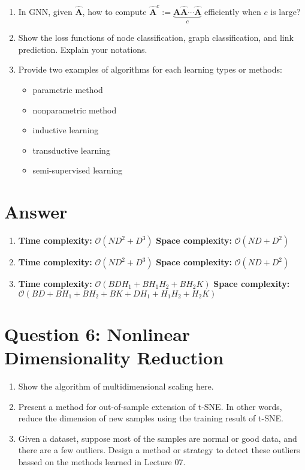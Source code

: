 \documentclass[
	12pt, %
]{fphw}
\begin{document}
\begin{problem}
\begin{enumerate}
	\item In GNN, given $\hat{\mathbf{A}}$, how to compute $\hat{\mathbf{A}}^c:=\underbrace{\hat{\mathbf{A}}\hat{\mathbf{A}}\cdots \hat{\mathbf{A}}}_c$ efficiently when $c$ is large? 
    
    \item Show the loss functions of node classification, graph classification, and link prediction. Explain your notations.
    
    \item Provide two examples of algorithms for each learning types or methods:
    \begin{itemize}
        \item parametric method
        \item nonparametric method
        \item inductive learning
        \item transductive learning
        \item semi-supervised learning
    \end{itemize}
\end{enumerate}
\end{problem}

\section*{Answer}
\begin{enumerate}
	\item \textbf{Time complexity:} ${\mathcal O}(ND^{2}+D^{3})$ \textbf{Space complexity:} ${\mathcal O}(ND+D^{2})$
	\item \textbf{Time complexity:} ${\mathcal O}(ND^{2}+D^{3})$ \textbf{Space complexity:} ${\mathcal O}(ND+D^{2})$
	\item \textbf{Time complexity:} ${\mathcal O}(BDH_1+BH_1H_2+BH_2K)$ \textbf{Space complexity:} ${\mathcal O}(BD+BH_1+BH_2+BK+DH_1+H_1H_2+H_2K)$
\end{enumerate}


\section*{Question 6: Nonlinear Dimensionality Reduction}

\begin{problem}
	\begin{enumerate}
	\item Show the algorithm of multidimensional scaling here. 
    
    \item Present a method for out-of-sample extension of t-SNE. In other words, reduce the dimension of new samples using the training result of t-SNE. 
    
    \item Given a dataset, suppose most of the samples are normal or good data, and there are a few outliers. Design a method or strategy to detect these outliers bassed on the methods learned in Lecture 07.
\end{enumerate}
\end{problem}
\end{document}
